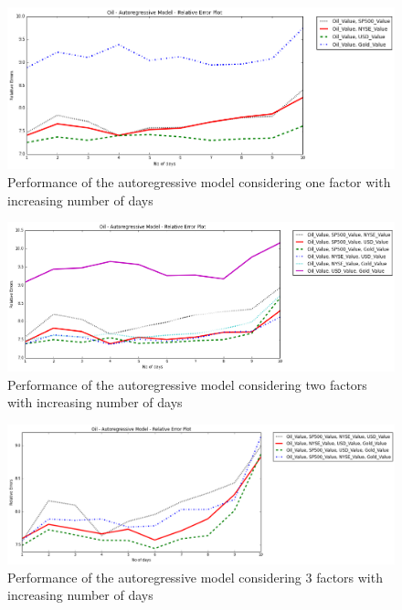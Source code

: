 \documentclass[runningheads]{llncs}
\begin{document}
\begin{figure}
\centering
\includegraphics[width=\textwidth]{oil_autoregressive_1factor_10.png}
\caption{Performance of the autoregressive model considering one factor with increasing number of days}
\label{fig:oil_autoregressive_1factor_10.png}
\end{figure}

\begin{figure}
\centering
\includegraphics[width=\textwidth]{oil_autoregressive_2factors_10.png}
\caption{Performance of the autoregressive model considering two factors with increasing number of days}
\label{fig:oil_autoregressive_2factors_10.png}
\end{figure}

\begin{figure}
\centering
\includegraphics[width=\textwidth]{oil_autoregressive_3factors_10.png}
\caption{Performance of the autoregressive model considering 3 factors with increasing number of days}
\label{fig:oil_autoregressive_3factors_10.png}
\end{figure}
\end{document}
